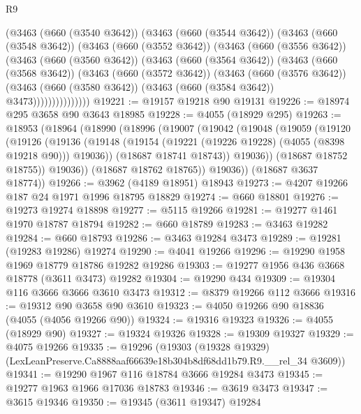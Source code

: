 \begin{lexlean}{R9}
\begin{coremodule}
          (@3463
            (@660 (@3540 @3642))
            (@3463
              (@660 (@3544 @3642))
              (@3463
                (@660 (@3548 @3642))
                (@3463
                  (@660 (@3552 @3642))
                  (@3463
                    (@660 (@3556 @3642))
                    (@3463
                      (@660 (@3560 @3642))
                      (@3463
                        (@660 (@3564 @3642))
                        (@3463
                          (@660 (@3568 @3642))
                          (@3463
                            (@660 (@3572 @3642))
                            (@3463
                              (@660 (@3576 @3642))
                              (@3463
                                (@660 (@3580 @3642))
                                (@3463 (@660 (@3584 @3642)) @3473)))))))))))))))
@19221 := @19157 @19218 @90 @19131
@19226 := @18974 @295 @3658 @90 @3643 @18985
@19228 := @4055 (@18929 @295)
@19263 := @18953
    (@18964
      (@18990
        (@18996
          (@19007
            (@19042
              (@19048
                (@19059
                  (@19120
                    (@19126
                      (@19136
                        (@19148 (@19154 (@19221 (@19226 @19228) (@4055 (@8398 @19218 @90))) @19036))
                        (@18687 @18741 @18743))
                      @19036))
                  (@18687 @18752 @18755))
                @19036))
            (@18687 @18762 @18765))
          @19036))
      (@18687 @3637 @18774))
@19266 := @3962 (@4189 @18951) @18943
@19273 := @4207 @19266 @187 @24 @1971 @1996 @18795 @18829
@19274 := @660 @18801
@19276 := @19273 @19274 @18898
@19277 := @5115 @19266
@19281 := @19277 @1461 @1970 @18787 @18794
@19282 := @660 @18789
@19283 := @3463 @19282
@19284 := @660 @18793
@19286 := @3463 @19284 @3473
@19289 := @19281 (@19283 @19286) @19274
@19290 := @4041 @19266
@19296 := @19290 @1958 @1969 @18779 @18786 @19282 @19286
@19303 := @19277 @1956 @436 @3668 @18778 (@3611 @3473) @19282
@19304 := @19290 @434
@19309 := @19304 @116 @3666 @3666 @3610 @3473
@19312 := @8379 @19266 @112 @3666
@19316 := @19312 @90 @3658 @90 @3610
@19323 := @4050 @19266 @90 @18836 (@4055 (@4056 @19266 @90))
@19324 := @19316 @19323
@19326 := @4055 (@18929 @90)
@19327 := @19324 @19326
@19328 := @19309 @19327
@19329 := @4075 @19266
@19335 := @19296
    (@19303 (@19328 @19329) (LexLeanPreserve.Ca8888aaf66639e18b304b8df68dd1b79.R9.__rel_34 @3609))
@19341 := @19290 @1967 @116 @18784 @3666 @19284 @3473
@19345 := @19277 @1963 @1966 @17036 @18783
@19346 := @3619 @3473
@19347 := @3615 @19346
@19350 := @19345 (@3611 @19347) @19284

\end{coremodule}
\end{lexlean}
